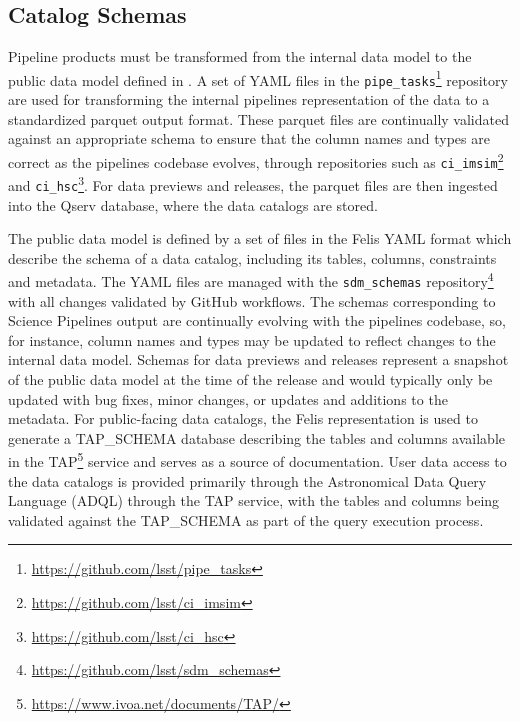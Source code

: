 \subsection{Catalog Schemas}
\label{sec:schemas}

Pipeline products must be transformed from the internal data model to the public data model defined in \citet{LSE-163}.
A set of YAML files in the \texttt{pipe\_tasks}\footnote{\url{https://github.com/lsst/pipe\_tasks}} repository are used for transforming the internal pipelines representation of the data to a standardized parquet output format.
These parquet files are continually validated against an appropriate schema to ensure that the column names and types are correct as the pipelines codebase evolves, through repositories such as \texttt{ci\_imsim}\footnote{\url{https://github.com/lsst/ci\_imsim}} and \texttt{ci\_hsc}\footnote{\url{https://github.com/lsst/ci\_hsc}}.
For data previews and releases, the parquet files are then ingested into the Qserv database, where the data catalogs are stored.

The public data model is defined by a set of files in the Felis\citep{2024arXiv241209721M} YAML format which describe the schema of a data catalog, including its tables, columns, constraints and metadata.
The YAML files are managed with the \texttt{sdm\_schemas} repository\footnote{\url{https://github.com/lsst/sdm\_schemas}} with all changes validated by GitHub workflows.
The schemas corresponding to Science Pipelines output are continually evolving with the pipelines codebase, so, for instance, column names and types may be updated to reflect changes to the internal data model.
Schemas for data previews and releases represent a snapshot of the public data model at the time of the release and would typically only be updated with bug fixes, minor changes, or updates and additions to the metadata.
For public-facing data catalogs, the Felis representation is used to generate a TAP\_SCHEMA database describing the tables and columns available in the TAP\footnote{\url{https://www.ivoa.net/documents/TAP/}} service and serves as a source of documentation.
User data access to the data catalogs is provided primarily through the Astronomical Data Query Language (ADQL) through the TAP service, with the tables and columns being validated against the TAP\_SCHEMA as part of the query execution process.
